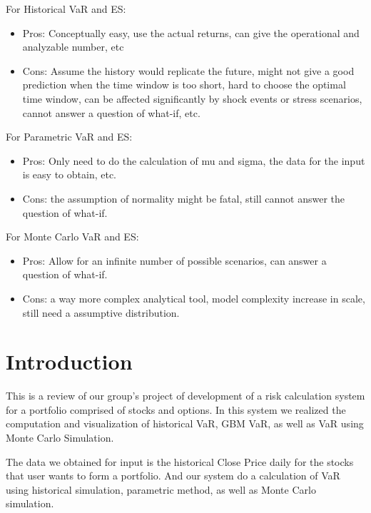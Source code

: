 \documentclass[letterpaper,11pt, oneside]{layout}
\begin{document}
For Historical VaR and ES: 
\begin{itemize}
\item Pros: Conceptually easy, use the actual returns, can give the operational and analyzable number, etc
\item Cons: Assume the history would replicate the future, might not give a good prediction when the time window is too short, hard to choose the optimal time window, can be affected significantly by shock events or stress scenarios, cannot answer a question of what-if, etc.
\end{itemize}

For Parametric VaR and ES: 
\begin{itemize}
\item Pros: Only need to do the calculation of mu and sigma, the data for the input is easy to obtain, etc.
\item Cons: the assumption of normality might be fatal, still cannot answer the question of what-if.
\end{itemize}

For Monte Carlo VaR and ES: 
\begin{itemize}
\item Pros: Allow for an infinite number of possible scenarios, can answer a question of what-if.
\item Cons: a way more complex analytical tool, model complexity increase in scale, still need a assumptive distribution. 
\end{itemize}


\begingroup
\renewcommand{\clearpage}{}
\chapter{Introduction}
\label{chap:intro}
\endgroup
This is a review of our group’s project of development of a risk calculation system for a portfolio comprised of stocks and options. In this system we realized the computation and visualization of historical VaR, GBM VaR, as well as VaR using Monte Carlo Simulation. 

The data we obtained for input is the historical Close Price daily for the stocks that user wants to form a portfolio. And our system do a calculation of VaR using historical simulation, parametric method, as well as Monte Carlo simulation.

\end{document}
